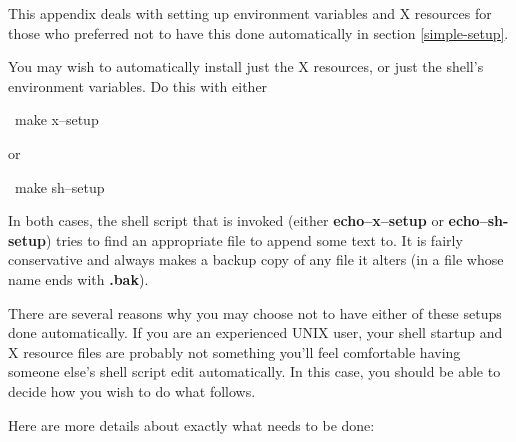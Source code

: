 This appendix deals with setting up environment variables and X
resources for those who preferred not to have this done automatically
in section \ref{simple-setup}.

You may wish to automatically install just the X resources, or just
the shell's environment variables. Do this with either

\begin{shell}
\prompt\ make x--setup
\end{shell}

or

\begin{shell}
\prompt\ make sh--setup
\end{shell}

In both cases, the shell script that is invoked (either {\bf
echo--x--setup} or {\bf echo--sh-setup}) tries to find an appropriate
file to append some text to. It is fairly conservative and always
makes a backup copy of any file it alters (in a file whose name ends
with {\bf .bak}).

There are several reasons why you may choose not to have either of
these setups done automatically. If you are an experienced UNIX user,
your shell startup and X resource files are probably not something
you'll feel comfortable having someone else's shell script edit
automatically. In this case, you should be able to decide how you wish
to do what follows.

Here are more details about exactly what needs to be done:

